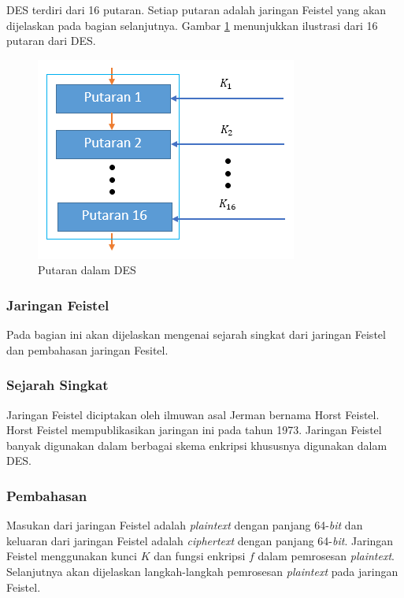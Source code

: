 DES terdiri dari 16 putaran. Setiap putaran adalah jaringan Feistel yang akan dijelaskan pada bagian selanjutnya. Gambar \ref{fig:putarandes} menunjukkan ilustrasi dari 16 putaran dari DES.

\begin{figure}[H]
	\includegraphics[scale=0.8]{Gambar/putaran_des}
	\centering
	\caption{Putaran dalam DES}\label{fig:putarandes}
\end{figure}

\subsubsection{Jaringan Feistel}

Pada bagian ini akan dijelaskan mengenai sejarah singkat dari jaringan Feistel dan pembahasan jaringan Fesitel.

\subsubsection{Sejarah Singkat}

Jaringan Feistel diciptakan oleh ilmuwan asal Jerman bernama Horst Feistel. Horst Feistel mempublikasikan jaringan ini pada tahun 1973. Jaringan Feistel banyak digunakan dalam berbagai skema enkripsi khususnya digunakan dalam DES.

\subsubsection{Pembahasan}

Masukan dari jaringan Feistel adalah \textit{plaintext} dengan panjang 64-\textit{bit} dan keluaran dari jaringan Feistel adalah \textit{ciphertext} dengan panjang 64-\textit{bit}. Jaringan Feistel menggunakan kunci \begin{math}K\end{math} dan fungsi enkripsi \begin{math}f\end{math} dalam pemrosesan \textit{plaintext}. Selanjutnya akan dijelaskan langkah-langkah pemrosesan \textit{plaintext} pada jaringan Feistel.

